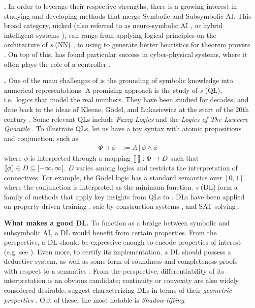 \textbf{\InAI{}.} In order to leverage their respective strengths, there is a growing interest in studying and developing methods that merge Symbolic and Subsymbolic AI. This broad category, nicked \emph{\InAI{}}  \citep{platzer2024intersymbolic} (also referred to as neuro-symbolic AI \citep{d2009neural}, or hybrid intelligent systems \citep{medsker2012hybrid}), can range from applying logical principles on the architecture of \emph{ \NN{}s} (NN)  \citep{badreddine2022logic, petersen2022deep}, to using \SuAI{} to generate better heuristics for theorem provers \citep{laurent2022learning}. On top of this, \InAI{} has found particular success in cyber-physical systems, where it often plays the role of a controller \citep{platzer2024intersymbolic}.

\textbf{\DL{}.} One of the main challenges of \InAI{} is the grounding of symbolic knowledge into numerical representations. A promising approach is the study of \emph{\QL{}s} (QL), i.e.~logics that model the real numbers. They have been studied for decades, and date back to the ideas of Kleene, G\"{o}del, and Łukasiewicz at the start of the 20th century \citep{cintula2011handbook, prooffuzzy}. Some relevant QLs include \emph{Fuzzy Logics} \citep{cintula2011handbook} and the \emph{Logics of The Lawvere Quantile} \citep{bacci2024polynomial, bacci2023propositional, capucci2024quantifiers, bacci2025induction}. To illustrate QLs, let us have a toy syntax with atomic propositions and conjunction, such as
\begin{equation}
\begin{split}
    \Phi \ni \phi &:= A \,|\, \phi \land \phi
\end{split}
\end{equation}
where $\phi$ is interpreted through a mapping $\llbracket \cdot \rrbracket : \Phi \rightarrow D$ such that $ \llbracket \phi \rrbracket \in D \subseteq [-\infty,\infty]$. $D$ varies among logics and restricts the interpretation of connectives. For example, the
G\"{o}del logic \citep{BAAZ200723} has a standard semantics over $[0, 1]$ where the conjunction is interpreted as the minimum function. \emph{\DL{}s} (DL) form a family of methods that apply key insights from QLs to \InAI{}. DLs have been applied on property-driven training \citep{FLINKOW2025103280}, safe-by-construction systems \citep{badreddine2022logic}, and SAT solving \citep{kyrillidis2021continuous, gaglione2022maxsat}. 

\textbf{What makes a good DL.} To function as a bridge between symbolic and subsymbolic AI, a DL would benefit from certain properties. From the \SiAI{} perspective, a DL should be expressive enough to encode properties of interest (e.g. see \citep{vehicle}). Even more, to certify its implementation, a DL should possess a deductive system, as well as some form of soundness and completeness proofs with respect to a semantics \citep{floyd1993assigning, goguen1977initial}. From the \SuAI{} perspective, differentiability of its interpretation is an obvious candidate; continuity or convexity are also widely considered desirable; \citeauthor{varnai2020robustness} suggest characterizing DLs in terms of their \textit{geometric properties} \citep{varnai2020robustness}. Out of these, the most notable is \emph{Shadow-lifting}:

